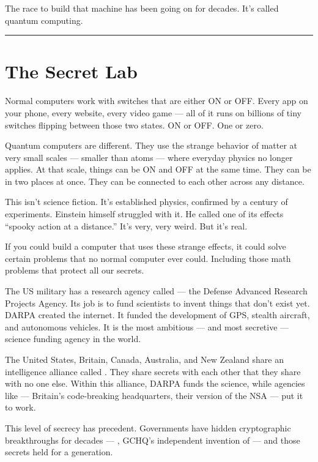 The race to build that machine has been going on for decades. It's called quantum computing.

\vspace{1cm}\noindent\rule{0.5\textwidth}{0.5pt}\vspace{0.5cm}

\section*{The Secret Lab}
\label{front:the-secret-lab}

Normal computers work with switches that are either ON or OFF\@. Every app on your phone, every website, every video game --- all of it runs on billions of tiny switches flipping between those two states. ON or OFF\@. One or zero.

Quantum computers are different. They use the strange behavior of matter at very small scales --- smaller than atoms --- where everyday physics no longer applies. At that scale, things can be ON and OFF at the same time. They can be in two places at once. They can be connected to each other across any distance.

This isn't science fiction. It's established physics, confirmed by a century of experiments. Einstein himself struggled with it. He called one of its effects ``spooky action at a distance.'' It's very, very weird. But it's real.

If you could build a computer that uses these strange effects, it could solve certain problems that no normal computer ever could. Including those math problems that protect all our secrets.

The US military has a research agency called  --- the Defense Advanced Research Projects Agency. Its job is to fund scientists to invent things that don't exist yet. DARPA created the internet. It funded the development of GPS, stealth aircraft, and autonomous vehicles. It is the most ambitious --- and most secretive --- science funding agency in the world.

The United States, Britain, Canada, Australia, and New Zealand share an intelligence alliance called . They share secrets with each other that they share with no one else. Within this alliance, DARPA funds the science, while agencies like  --- Britain's code-breaking headquarters, their version of the NSA --- put it to work.

This level of secrecy has precedent. Governments have hidden cryptographic breakthroughs for decades --- , GCHQ's independent invention of  --- and those secrets held for a generation.

